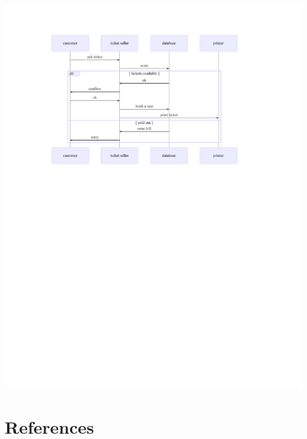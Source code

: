 \documentclass[
  letterpaper,
]{scrbook}
\begin{document}
\includegraphics{./summary_files/figure-pdf/unnamed-chunk-5-1.pdf}


\hypertarget{references}{%
\chapter*{References}\label{references}}

\end{document}
